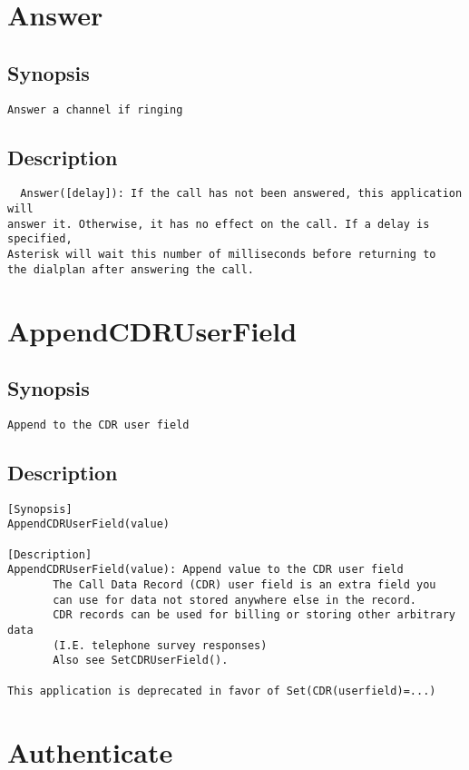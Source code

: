 \section{Answer}
\subsection{Synopsis}
\begin{verbatim}
Answer a channel if ringing
\end{verbatim}
\subsection{Description}
\begin{verbatim}
  Answer([delay]): If the call has not been answered, this application will
answer it. Otherwise, it has no effect on the call. If a delay is specified,
Asterisk will wait this number of milliseconds before returning to
the dialplan after answering the call.

\end{verbatim}


\section{AppendCDRUserField}
\subsection{Synopsis}
\begin{verbatim}
Append to the CDR user field
\end{verbatim}
\subsection{Description}
\begin{verbatim}
[Synopsis]
AppendCDRUserField(value)

[Description]
AppendCDRUserField(value): Append value to the CDR user field
       The Call Data Record (CDR) user field is an extra field you
       can use for data not stored anywhere else in the record.
       CDR records can be used for billing or storing other arbitrary data
       (I.E. telephone survey responses)
       Also see SetCDRUserField().

This application is deprecated in favor of Set(CDR(userfield)=...)

\end{verbatim}


\section{Authenticate}
